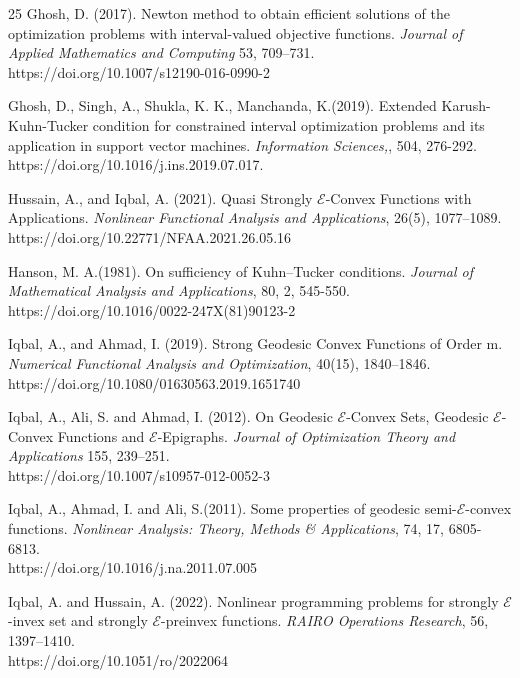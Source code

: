 \documentclass[12pt, reqno]{amsart}
\theoremstyle{definition}
\theoremstyle{remark}
\numberwithin{equation}{section}
\begin{document}
\begin{thebibliography}{25}
Ghosh, D. (2017).  Newton method to obtain efficient solutions of the optimization problems with interval-valued objective functions. \textit{Journal of Applied Mathematics and Computing} 53, 709–731.\\ https://doi.org/10.1007/s12190-016-0990-2

Ghosh, D., Singh, A., Shukla, K. K., Manchanda, K.(2019).
Extended Karush-Kuhn-Tucker condition for constrained interval optimization problems and its application in support vector machines. \textit{Information Sciences,}, 504, 276-292.\\
https://doi.org/10.1016/j.ins.2019.07.017.
        
 Hussain, A., and Iqbal, A. (2021). Quasi Strongly $\mathcal{E}$-Convex Functions with Applications. \textit{Nonlinear Functional Analysis and Applications}, 26(5), 1077–1089.\\ https://doi.org/10.22771/NFAA.2021.26.05.16
       	
  Hanson, M. A.(1981). On sufficiency of Kuhn–Tucker conditions. \textit{Journal of Mathematical Analysis and Applications}, 80, 2, 545-550.\\
https://doi.org/10.1016/0022-247X(81)90123-2
       	
Iqbal, A., and Ahmad, I. (2019). Strong Geodesic Convex Functions of Order m. \textit{Numerical Functional Analysis and Optimization}, 40(15), 1840–1846.\\ https://doi.org/10.1080/01630563.2019.1651740
    
 Iqbal, A., Ali, S. and Ahmad, I. (2012). On Geodesic $\mathcal{E}$-Convex Sets, Geodesic $\mathcal{E}$-Convex Functions and $\mathcal{E}$-Epigraphs. \textit{Journal of Optimization Theory and Applications} 155, 239–251.\\
https://doi.org/10.1007/s10957-012-0052-3

  Iqbal, A., Ahmad, I. and  Ali, S.(2011).
Some properties of geodesic semi-$\mathcal{E}$-convex functions.
\textit{Nonlinear Analysis: Theory, Methods \& Applications}, 74, 17, 6805-6813.\\
https://doi.org/10.1016/j.na.2011.07.005

  Iqbal, A. and  Hussain, A. (2022).  Nonlinear programming problems for strongly $\mathcal{\mathcal{E}}$-invex set and strongly $\mathcal{\mathcal{E}}$-preinvex functions. \textit{RAIRO Operations Research}, 56, 1397–1410.\\
https://doi.org/10.1051/ro/2022064
        

\end{thebibliography}
\end{document}
